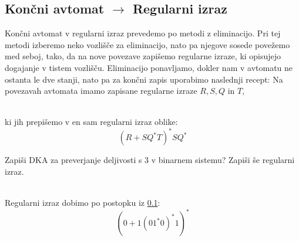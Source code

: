 \documentclass[10pt,a4paper,oneside]{book}
\begin{document}
\subsection{Končni avtomat $\rightarrow$ Regularni izraz}\label{KA-RI}
Končni avtomat v regularni izraz prevedemo po metodi z eliminacijo. Pri tej metodi izberemo neko vozlišče za eliminacijo, nato pa njegove sosede povežemo med seboj, tako, da na nove povezave zapišemo regularne izraze, ki opisujejo dogajanje v tistem vozlišču. Eliminacijo ponavljamo, dokler nam v avtomatu ne ostanta le dve stanji, nato pa za končni zapis uporabimo naslednji recept:
\br
Na povezavah avtomata imamo zapisane regularne izraze $R,S,Q$ in $T$,\\
\\
ki jih prepišemo v en sam regularni izraz oblike:
\begin{displaymath}
(R+SQ^*T)^*SQ^*
\end{displaymath}

\begin{primeri}
\item Zapiši DKA za preverjanje deljivosti s 3 v binarnem sistemu? Zapiši še regularni izraz.\\
\ \\
Regularni izraz dobimo po postopku iz \ref{KA-RI}:
\begin{displaymath}
(0+1(01^*0)^*1)^*
\end{displaymath}
\end{primeri}
\end{document}
